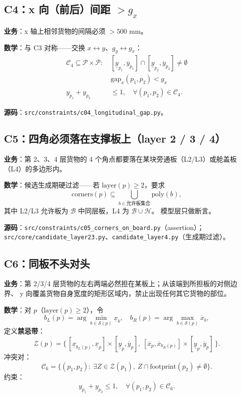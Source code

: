 \documentclass[a4paper,11pt]{ctexart}
\newcommand{\set}[1]{\mathcal{#1}}
\begin{document}
\subsection{C4：x 向（前后）间距 $> g_x$}

\textbf{业务}：x 轴上相邻货物的间隔必须 $> 500$ mm。

\textbf{数学}：与 C3 对称——交换 $x \leftrightarrow y$、$g_y \leftrightarrow g_x$：
\begin{align*}
\set{C}_4 \subseteq\set{P}\times\set{P}:\
&[\underline{y}_{p_1},\overline{y}_{p_1}]\cap[\underline{y}_{p_2},\overline{y}_{p_2}]\neq\emptyset\\
&\text{gap}_x(p_1,p_2)<g_x\\
y_{p_1}+y_{p_2}&\leq 1, \quad \forall (p_1,p_2)\in\set{C}_4.
\end{align*}

\textbf{源码}：\texttt{src/constraints/c04\_longitudinal\_gap.py}。

\subsection{C5：四角必须落在支撑板上（layer 2 / 3 / 4）}

\textbf{业务}：第 2、3、4 层货物的 4 个角点都要落在某块旁通板（L2/L3）或舱盖板（L4）的多边形内。

\textbf{数学}：候选生成期硬过滤——若 $\text{layer}(p)\geq 2$，要求
\[
\text{corners}(p)\subseteq \bigcup_{b\in\text{允许板集合}} \text{poly}(b),
\]
其中 L2/L3 允许板为 $\set{B}$ 中同层板，L4 为 $\set{B}\cup\set{H}$。
模型层只做断言。

\textbf{源码}：\texttt{src/constraints/c05\_corners\_on\_board.py}（assertion）；
\texttt{src/core/candidate\_layer23.py}、\texttt{candidate\_layer4.py}（生成期过滤）。

\subsection{C6：同板不头对头}

\textbf{业务}：第 2/3/4 层货物的左右两端必然担在某板上；从该端到所担板的对侧边界、
y 向覆盖货物自身宽度的矩形区域内，禁止出现任何其它货物的部位。

\textbf{数学}：对 $p$（$\text{layer}(p)\geq 2$），令
\[
b_L(p)=\arg\min_{b\in\set{S}(p)}\underline{x}_b, \quad
b_R(p)=\arg\max_{b\in\set{S}(p)}\overline{x}_b,
\]
定义\textbf{禁忌带}：
\[
\set{Z}(p) = \big\{\,
[\underline{x}_{b_L(p)},\underline{x}_p]\times[\underline{y}_p,\overline{y}_p],\ %
[\overline{x}_p,\overline{x}_{b_R(p)}]\times[\underline{y}_p,\overline{y}_p]
\,\big\}.
\]
冲突对：
\[
\set{C}_6 = \big\{ (p_1,p_2):\ \exists Z\in\set{Z}(p_1),\ Z\cap\text{footprint}(p_2)\neq\emptyset\big\}.
\]
约束：
\begin{equation}
y_{p_1}+y_{p_2}\leq 1, \quad \forall (p_1,p_2)\in\set{C}_6.
\end{equation}
\end{document}
